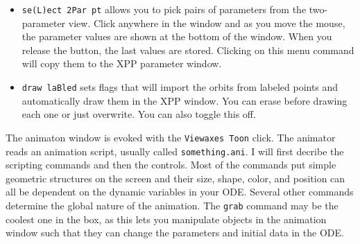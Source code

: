 \documentclass{article}
\begin{document}
\begin{itemize}
\begin{itemize}
\item {\tt se(L)ect 2Par pt} allows you to pick pairs of parameters from the two-parameter view. Click anywhere in the window and as you move the mouse, the parameter values are shown at the bottom of the window. When you release the button, the last values are stored. Clicking on this menu command will copy them to the XPP parameter window.
\item {\tt draw laBled} sets flags that will import the orbits from labeled points and automatically draw them in the XPP window. You can erase before drawing each one or just overwrite. You can also toggle this off. 
\end{itemize}

\end{itemize}

\bigskip
{}

The animaton window is evoked with the {\tt Viewaxes Toon} click. The animator reads an animation script, usually called {\tt something.ani}. I will first decribe the scripting commands and then the controls. Most of the commands put simple geometric structures on the screen and their size, shape, color, and position can all be dependent on the dynamic variables in your ODE. Several other commands determine the global nature of the animation. The {\tt grab} command may be the coolest one in the box, as this lets you manipulate objects in the animation window such that they can change the parameters and initial data in the ODE. 
\end{document}
